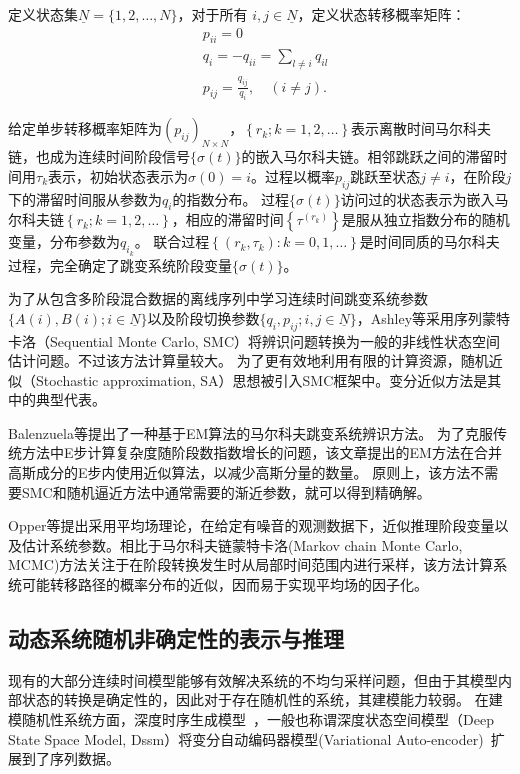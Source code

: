 定义状态集$\underline{N}=\{1,2, \ldots, N\}$，对于所有 $i, j \in \underline{N}$，定义状态转移概率矩阵：
\begin{equation}
    \begin{aligned}
    &p_{i i}=0\\
    &q_i=-q_{i i}=\sum_{l \neq i} q_{i l}\\
    &p_{i j}=\frac{q_{i j}}{q_i}, \quad(i \neq j) .
    \end{aligned}
\end{equation}

给定单步转移概率矩阵为$\left(p_{i j}\right)_{N \times N}$，$\left\{r_k ; k=1,2, \ldots\right\}$表示离散时间马尔科夫链，也成为连续时间阶段信号$\{\sigma(t)\}$的嵌入马尔科夫链。相邻跳跃之间的滞留时间用$\tau_k$表示，初始状态表示为$\sigma (0)=i$。过程以概率$p_{ij}$跳跃至状态$j\neq i$，在阶段$j$下的滞留时间服从参数为$q_i$的指数分布。
过程$\{\sigma(t)\}$访问过的状态表示为嵌入马尔科夫链$\left\{r_k ; k=1,2, \ldots\right\}$，相应的滞留时间$\left\{\tau^{\left(r_k\right)}\right\}$是服从独立指数分布的随机变量，分布参数为$q_{i_k}$。
联合过程$\left\{\left(r_k, \tau_k\right): k=0,1, \ldots\right\}$是时间同质的马尔科夫过程，完全确定了跳变系统阶段变量$\{\sigma(t)\}$。

为了从包含多阶段混合数据的离线序列中学习连续时间跳变系统参数$\{A(i),B(i);i \in \underline{N}\}$以及阶段切换参数$\{q_i,p_{ij};i,j \in \underline{N}\}$，Ashley等采用序列蒙特卡洛（Sequential Monte Carlo, SMC）\cite{ashley2014sequential}将辨识问题转换为一般的非线性状态空间估计问题。不过该方法计算量较大。
为了更有效地利用有限的计算资源，随机近似（Stochastic approximation, SA）\cite{svensson2014identification}思想被引入SMC框架中。变分近似方法\cite{opper2007variational}是其中的典型代表。

Balenzuela等提出了一种基于EM算法的马尔科夫跳变系统辨识方法\cite{balenzuela2022parameter}。
为了克服传统方法中E步计算复杂度随阶段数指数增长的问题，该文章提出的EM方法在合并高斯成分的E步内使用近似算法，以减少高斯分量的数量。
原则上，该方法不需要SMC和随机逼近方法中通常需要的渐近参数，就可以得到精确解。

Opper等\cite{opper2007variational}提出采用平均场理论，在给定有噪音的观测数据下，近似推理阶段变量以及估计系统参数。相比于马尔科夫链蒙特卡洛(Markov chain Monte Carlo, MCMC)方法关注于在阶段转换发生时从局部时间范围内进行采样，该方法计算系统可能转移路径的概率分布的近似，因而易于实现平均场的因子化。

\subsection{动态系统随机非确定性的表示与推理}
现有的大部分连续时间模型能够有效解决系统的不均匀采样问题，但由于其模型内部状态的转换是确定性的，因此对于存在随机性的系统，其建模能力较弱。
在建模随机性系统方面，深度时序生成模型~\cite{Fraccaro2016,Chung2015,Karl2017}，一般也称谓深度状态空间模型（Deep State Space Model, Dssm）将变分自动编码器模型(Variational Auto-encoder)~\cite{kingma2013auto}扩展到了序列数据。

